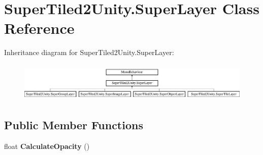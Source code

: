 \hypertarget{class_super_tiled2_unity_1_1_super_layer}{}\section{Super\+Tiled2\+Unity.\+Super\+Layer Class Reference}
\label{class_super_tiled2_unity_1_1_super_layer}
Inheritance diagram for Super\+Tiled2\+Unity.\+Super\+Layer\+:\begin{figure}[H]
\begin{center}
\leavevmode
\includegraphics[height=1.875000cm]{class_super_tiled2_unity_1_1_super_layer}
\end{center}
\end{figure}
\subsection*{Public Member Functions}
\begin{DoxyCompactItemize}
\item 
\mbox{\label{class_super_tiled2_unity_1_1_super_layer_a18a75c85909ad4694a9ea480a1cae67b}} 
float {\bfseries Calculate\+Opacity} ()
\end{DoxyCompactItemize}
